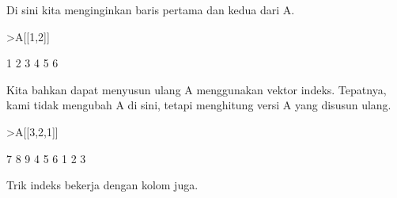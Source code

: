 \documentclass[a4paper,10pt]{article}
\begin{document}
\begin{eulernotebook}
\begin{eulercomment}
\begin{eulercomment}
\begin{eulercomment}
\begin{eulercomment}
\begin{eulercomment}
Di sini kita menginginkan baris pertama dan kedua dari A.
\end{eulercomment}
\begin{eulerprompt}
>A[[1,2]]
\end{eulerprompt}
\begin{euleroutput}
              1             2             3 
              4             5             6 
\end{euleroutput}
\begin{eulercomment}
Kita bahkan dapat menyusun ulang A menggunakan vektor indeks.
Tepatnya, kami tidak mengubah A di sini, tetapi menghitung versi A
yang disusun ulang.
\end{eulercomment}
\begin{eulerprompt}
>A[[3,2,1]]
\end{eulerprompt}
\begin{euleroutput}
              7             8             9 
              4             5             6 
              1             2             3 
\end{euleroutput}
\begin{eulercomment}
Trik indeks bekerja dengan kolom juga.


\end{eulercomment}
\end{eulercomment}
\end{eulercomment}
\end{eulercomment}
\end{eulercomment}
\end{eulernotebook}
\end{document}
